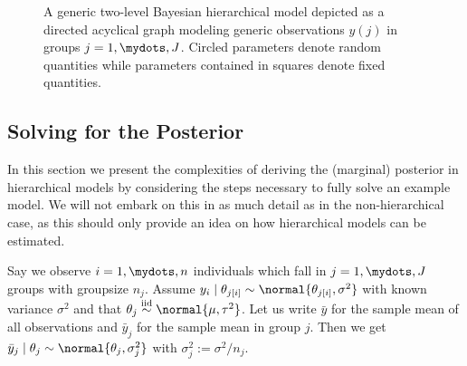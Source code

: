 \begin{figure}[ht]
\begin{center}
\end{center}
\label{fig:group_sem}
\caption{A generic two-level Bayesian hierarchical model depicted as a directed acyclical graph modeling generic observations $y(j)$ in groups $j = 1,\mydots, J$. Circled parameters denote random quantities while parameters contained in squares denote fixed quantities.}
\end{figure}

\subsection{Solving for the Posterior}\label{sec:hierachical_solving}
In this section we present the complexities of deriving the (marginal) posterior in hierarchical models by considering the steps necessary to fully solve an example model.
We will not embark on this in as much detail as in the non-hierarchical case, as this should only provide an idea on how hierarchical models can be estimated.

Say we observe $i=1,\mydots,n$ individuals which fall in $j=1,\mydots,J$ groups with groupsize $n_j$.
Assume $y_i \mid \theta_{j[i]} \sim \normal{\theta_{j[i]}, \sigma^2}$ with known variance $\sigma^2$ and that $\theta_j \overset{\text{iid}}{\sim} \normal{\mu, \tau^2}$.
Let us write $\bar{y}$ for the sample mean of all observations and $\bar{y}_j$ for the sample mean in group $j$.
Then we get $\bar{y}_j \mid \theta_j \sim \normal{\theta_j, \sigma_j^2}$ with $\sigma_j^2 := \sigma^2 / n_j$.

